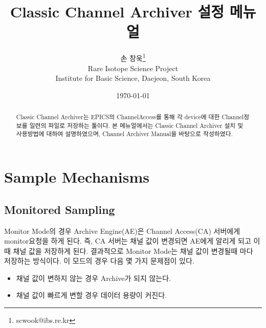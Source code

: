 \documentclass[11pt
  , a4paper
  , article
  , oneside
]{memoir}
\begin{document}
\newcommand{\technumber}{
  RAON Control-Document Series\\
  Revision : v1.0,   Release : June 24, 2014}
\title{\textbf{Classic Channel Archiver 설정 메뉴얼}}

\author{손 창욱\thanks{scwook@ibs.re.kr} \\

  Rare Isotope Science Project\\
  Institute for Basic Science, Daejeon, South Korea
}
\date{\today}

\renewcommand{\maketitlehooka}{\begin{flushright}\textsf{\technumber}\end{flushright}}

\maketitle

\begin{abstract}
Classic Channel Archiver는 EPICS의 ChannelAccess를 통해 각 device에 대한 Channel정보를
일련의 파일로 저장하는 툴이다. 본 메뉴얼에서는 Classic Channel Archiver 설치 및 사용방법에 
대하여 설명하였으며, Channel Archiver Manual\citep{CA_MANUAL}을 바탕으로 작성하였다.
\end{abstract}

\chapter{Sample Mechanisms}
\section{Monitored Sampling}
Monitor Mode의 경우 Archive Engine(AE)은 Channel Access(CA) 서버에게 monitor요청을 하게 된다.
즉, CA 서버는 채널 값이 변경되면 AE에게 알리게 되고 이 때 채널 값을 저장하게 된다. 결과적으로
Monitor Mode는 채널 값이 변경될때 마다 저장하는 방식이다. 이 모드의 경우 다음 몇 가지 문제점이
있다.
\begin{itemize}
\item 채널 값이 변하지 않는 경우 Archive가 되지 않는다. 
\item 채널 값이 빠르게 변할 경우 데이터 용량이 커진다.
\end{itemize} 
\end{document}
